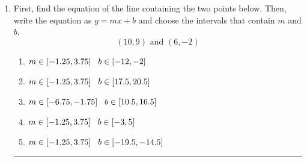 \documentclass[14pt]{extbook}
\newcommand{\litem}[1]{\item#1\hspace*{-1cm}\rule{\textwidth}{0.4pt}}
\begin{document}
\begin{enumerate}
{\begin{enumerate}[label=\Alph*.]
\end{enumerate} }
\litem{
First, find the equation of the line containing the two points below. Then, write the equation as $ y=mx+b $ and choose the intervals that contain $m$ and $b$.\[ (10, 9) \text{ and } (6, -2) \]\begin{enumerate}[label=\Alph*.]
\item \( m \in [-1.25, 3.75] \hspace*{3mm} b \in [-12, -2] \)
\item \( m \in [-1.25, 3.75] \hspace*{3mm} b \in [17.5, 20.5] \)
\item \( m \in [-6.75, -1.75] \hspace*{3mm} b \in [10.5, 16.5] \)
\item \( m \in [-1.25, 3.75] \hspace*{3mm} b \in [-3, 5] \)
\item \( m \in [-1.25, 3.75] \hspace*{3mm} b \in [-19.5, -14.5] \)

\end{enumerate} }
\end{enumerate}
\end{document}
